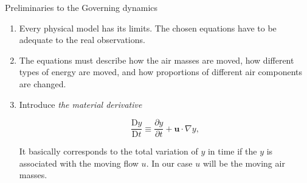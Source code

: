 \documentclass[10pt]{beamer}
\begin{document}
	\begin{frame}{Preliminaries to the Governing dynamics}
		
		\begin{enumerate}
			\item Every physical model has its limits. The chosen equations have to be adequate to the real observations.
			
			\item The equations must describe how the air masses are moved, how different types of energy are moved, and how proportions of different air components are changed.
			
			\item Introduce \textit{the material derivative}
			
			\begin{equation*}
				\frac{\mathrm{D}y}{\mathrm{D}t} \equiv \frac{\partial y}{\partial t} + \mathbf{u} \cdot \nabla y,
			\end{equation*}
			
			It basically corresponds to the total variation of $y$ in time if the $y$ is associated with the moving flow $u$. In our case $u$ will be the moving air masses.
		\end{enumerate}
		
	\end{frame}
	
\end{document}
